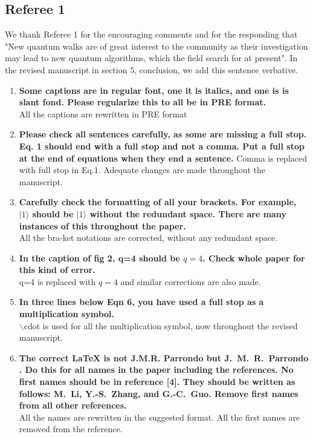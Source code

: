 \documentclass[10pt,a4paper]{article}
\begin{document}
\subsection*{Referee 1}
We thank Referee 1 for the encouraging comments and for the responding that "New quantum walks are of great interest to the community as their investigation may lead to new quantum algorithms, which the field search for at present". In the revised manuscript in section 5, conclusion, we add this sentence verbative.
\begin{enumerate}
\item \textbf{Some captions are in regular font, one it is italics, and one is is
slant fond. Please regularize this to all be in PRE format.}\\
All the captions are rewritten in PRE format  
\item \textbf{Please check all sentences carefully, as some are missing a full
stop. Eq. 1 should end with a full stop and not a comma. Put a full stop at the end of equations when they end a sentence.}
Comma is replaced with full stop in Eq.1. Adequate changes are made throughout the manuscript.
\item \textbf{Carefully check the formatting of all your brackets. For example, $\mid 1\rangle$ should be $\vert 1\rangle$ without the redundant space. There are many instances of this throughout the paper.}\\
All the bra-ket notations are corrected, without any redundant space.
\item \textbf{In the caption of fig 2, q=4 should be $q=4$. Check whole paper for
this kind of error.}\\
q=4 is replaced with $q=4$ and similar corrections are also made.
\item \textbf{In three lines below Eqn 6, you have used a full stop as a
multiplication symbol.}\\
$\backslash$cdot is used for all the multiplication symbol, now throughout the revised manuscript.
\item \textbf{The correct LaTeX is not J.M.R. Parrondo but J.~M.~R.~Parrondo . Do
this for all names in the paper including the references. No first names should be in reference [4]. They should be written as follows: M.~Li, Y.-S.~Zhang, and G.-C.~Guo. Remove first names from all other references.}\\
All the names are rewritten in the suggested format. All the first names are removed from the reference.
\end{enumerate}
\end{document}
